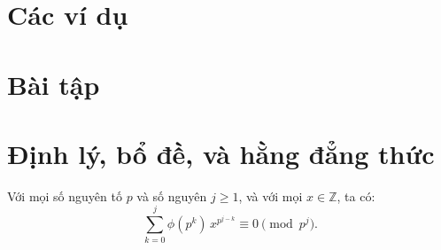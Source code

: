 \documentclass[../imo-training-open-book.tex]{subfiles}
\begin{document}
\newpage

\section{Các ví dụ}

 \newpage
 \newpage
 \newpage
 \newpage
 \newpage
 \newpage
 \newpage
 \newpage
 \newpage
 \newpage
 \newpage
 \newpage
 \newpage
 \newpage

\section{Bài tập}

 \bigbreak 
 \bigbreak
 \bigbreak
 \bigbreak

\newpage

\section{Định lý, bổ đề, và hằng đẳng thức}

\begin{lemma}
    \label{lemma:euler-power-sum-mod}
    Với mọi số nguyên tố \( p \) và số nguyên \( j \ge 1 \), và với mọi \( x \in \mathbb{Z} \), ta có:
    \[
        \sum_{k = 0}^{j} \phi\left(p^k\right)\, x^{p^{j - k}} \equiv 0 \pmod{p^j}.
    \]
    \end{lemma}
\end{document}
